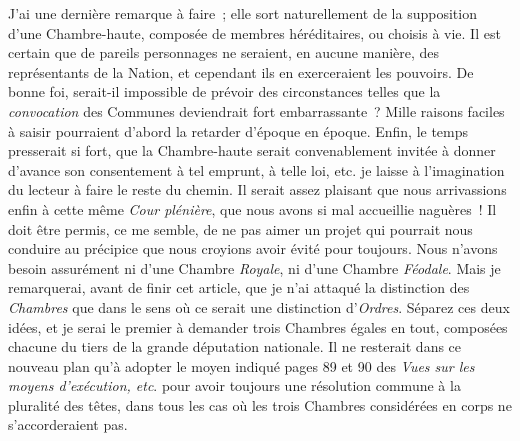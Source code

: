 \documentclass[french,twoside]{book} %
\begin{document}
J’ai une dernière remarque à faire ; elle sort naturellement de la supposition d’une Chambre-haute, composée de membres héréditaires, ou choisis à vie. Il est certain que de pareils personnages ne seraient, en aucune manière, des représentants de la Nation, et cependant ils en exerceraient les pouvoirs. De bonne foi, serait-il impossible de prévoir des circonstances telles que la {\itshape convocation} des Communes deviendrait fort embarrassante ? Mille raisons faciles à saisir pourraient d’abord la retarder d’époque en époque. Enfin, le temps presserait si fort, que la Chambre-haute serait convenablement invitée à donner d’avance son consentement à tel emprunt, à telle loi, etc. je laisse à l’imagination du lecteur à faire le reste du chemin. Il serait assez plaisant que nous arrivassions enfin à cette même {\itshape Cour plénière}, que nous avons si mal accueillie naguères ! Il doit être permis, ce me semble, de ne pas aimer un projet qui pourrait nous conduire au précipice que nous croyions avoir évité pour toujours. Nous n’avons besoin assurément ni d’une Chambre {\itshape Royale}, ni d’une Chambre {\itshape Féodale}. Mais je remarquerai, avant de finir cet article, que je n’ai attaqué la distinction des {\itshape Chambres} que dans le sens où ce serait une distinction d’{\itshape Ordres}. Séparez ces deux idées, et je serai le premier à demander trois Chambres égales en tout, composées chacune du tiers de la grande députation nationale. Il ne resterait dans ce nouveau plan qu’à adopter le moyen indiqué pages 89 et 90 des {\itshape Vues sur les moyens d’exécution, etc}. pour avoir toujours une résolution commune à la pluralité des têtes, dans tous les cas où les trois Chambres considérées en corps ne s’accorderaient pas.
\end{document}
